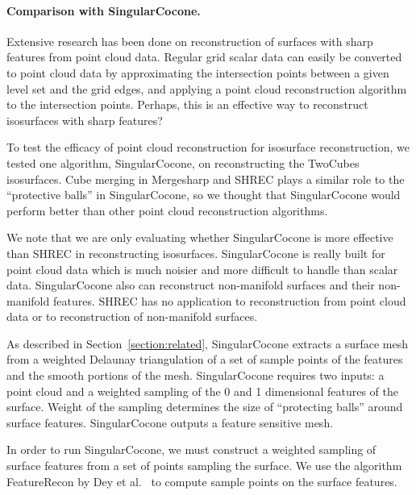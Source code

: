 \paragraph{Comparison with SingularCocone.}

Extensive research has been done on reconstruction of surfaces
with sharp features from point cloud data.
Regular grid scalar data can easily be converted to point cloud data
by approximating the intersection points 
between a given level set and the grid edges,
and applying a point cloud reconstruction algorithm to the intersection points.
Perhaps, this is an effective way to reconstruct isosurfaces 
with sharp features?

To test the efficacy of point cloud reconstruction
for isosurface reconstruction,
we tested one algorithm, SingularCocone,
on reconstructing the TwoCubes isosurfaces.
Cube merging in Mergesharp and SHREC plays a similar role
to the ``protective balls'' in SingularCocone,
so we thought that SingularCocone would perform
better than other point cloud reconstruction algorithms.

We note that we are only evaluating whether SingularCocone
is more effective than SHREC in reconstructing isosurfaces.
SingularCocone is really built for point cloud data
which is much noisier and more difficult to handle
than scalar data.
SingularCocone also can reconstruct non-manifold surfaces
and their non-manifold features.
SHREC has no application to reconstruction from point cloud data
or to reconstruction of non-manifold surfaces.

As described in Section~\ref{section:related},
SingularCocone extracts a surface mesh from a weighted Delaunay triangulation
of a set of sample points of the features and the smooth portions
of the mesh.
SingularCocone requires two inputs: 
a point cloud and a weighted sampling
of the 0 and 1 dimensional features of the surface.
Weight of the sampling determines the size of ``protecting balls''
around surface features.
SingularCocone outputs a feature sensitive mesh.

In order to run SingularCocone,
we must construct a weighted sampling of surface features
from a set of points sampling the surface.
We use the algorithm FeatureRecon by Dey et al.~\cite{Dey2013}
to compute sample points on the surface features.


